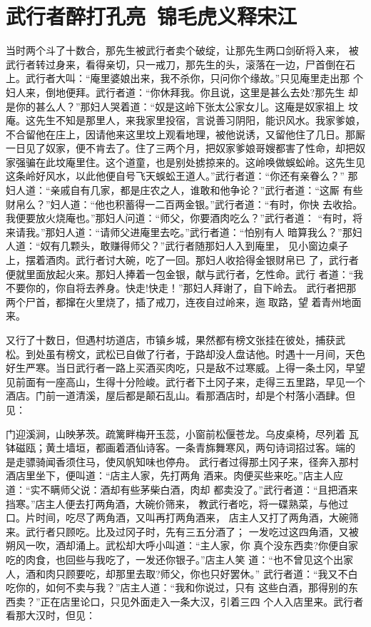 \chapter{武行者醉打孔亮~锦毛虎义释宋江}

当时两个斗了十数合，那先生被武行者卖个破绽，让那先生两口剑斫将入来，
被武行者转过身来，看得亲切，只一戒刀，那先生的头，滚落在一边，尸首倒在石
上。武行者大叫：“庵里婆娘出来，我不杀你，只问你个缘故。”只见庵里走出那
个妇人来，倒地便拜。武行者道：“你休拜我。你且说，这里是甚么去处?那先生
却是你的甚么人？”那妇人哭着道：“奴是这岭下张太公家女儿。这庵是奴家祖上
坟庵。这先生不知是那里人，来我家里投宿，言说善习阴阳，能识风水。我家爹娘，
不合留他在庄上，因请他来这里坟上观看地理，被他说诱，又留他住了几日。那厮
一日见了奴家，便不肯去了。住了三两个月，把奴家爹娘哥嫂都害了性命，却把奴
家强骗在此坟庵里住。这个道童，也是别处掳掠来的。这岭唤做蜈蚣岭。这先生见
这条岭好风水，以此他便自号飞天蜈蚣王道人。”武行者道：“你还有亲眷么？”
那妇人道：“亲戚自有几家，都是庄农之人，谁敢和他争论？”武行者道：“这厮
有些财帛么？”妇人道：“他也积蓄得一二百两金银。”武行者道：“有时，你快
去收拾。我便要放火烧庵也。”那妇人问道：“师父，你要酒肉吃么？”武行者道：
“有时，将来请我。”那妇人道：“请师父进庵里去吃。”武行者道：“怕别有人
暗算我么？”那妇人道：“奴有几颗头，敢赚得师父？”武行者随那妇人入到庵里，
见小窗边桌子上，摆着酒肉。武行者讨大碗，吃了一回。那妇人收拾得金银财帛已
了，武行者便就里面放起火来。那妇人捧着一包金银，献与武行者，乞性命。武行
者道：“我不要你的，你自将去养身。快走!快走！”那妇人拜谢了，自下岭去。
武行者把那两个尸首，都撺在火里烧了，插了戒刀，连夜自过岭来，迤取路，望
着青州地面来。

又行了十数日，但遇村坊道店，市镇乡城，果然都有榜文张挂在彼处，捕获武
松。到处虽有榜文，武松已自做了行者，于路却没人盘诘他。时遇十一月间，天色
好生严寒。当日武行者一路上买酒买肉吃，只是敌不过寒威。上得一条土冈，早望
见前面有一座高山，生得十分险峻。武行者下土冈子来，走得三五里路，早见一个
酒店。门前一道清溪，屋后都是颠石乱山。看那酒店时，却是个村落小酒肆。但见：

门迎溪涧，山映茅茨。疏篱畔梅开玉蕊，小窗前松偃苍龙。乌皮桌椅，尽列着
瓦钵磁瓯；黄土墙垣，都画着酒仙诗客。一条青旆舞寒风，两句诗词招过客。端的
是走骠骑闻香须住马，使风帆知味也停舟。
武行者过得那土冈子来，径奔入那村酒店里坐下，便叫道：“店主人家，先打两角
酒来。肉便买些来吃。”店主人应道：“实不瞒师父说：酒却有些茅柴白酒，肉却
都卖没了。”武行者道：“且把酒来挡寒。”店主人便去打两角酒，大碗价筛来，
教武行者吃，将一碟熟菜，与他过口。片时间，吃尽了两角酒，又叫再打两角酒来，
店主人又打了两角酒，大碗筛来。武行者只顾吃。比及过冈子时，先有三五分酒了；
一发吃过这四角酒，又被朔风一吹，酒却涌上。武松却大呼小叫道：“主人家，你
真个没东西卖?你便自家吃的肉食，也回些与我吃了，一发还你银子。”店主人笑
道：“也不曾见这个出家人，酒和肉只顾要吃，却那里去取?师父，你也只好罢休。”
武行者道：“我又不白吃你的，如何不卖与我？”店主人道：“我和你说过，只有
这些白酒，那得别的东西卖？”正在店里论口，只见外面走入一条大汉，引着三四
个人入店里来。武行者看那大汉时，但见：

